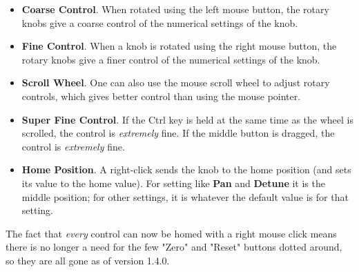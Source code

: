    \begin{itemize}

      \item \textbf{Coarse Control}.
         When rotated using the left mouse button, the rotary knobs give a
         coarse control of the numerical settings of the knob.

      \item \textbf{Fine Control}.
         When a knob is rotated using the right mouse button, the rotary knobs
         give a finer control of the numerical settings of the knob.

      \item \textbf{Scroll Wheel}.
         One can also use the mouse scroll wheel to adjust rotary controls,
         which gives better control than using the mouse pointer.

      \item \textbf{Super Fine Control}.
         If the Ctrl key is held at the same time as the wheel is scrolled, the
         control is \textsl{extremely} fine.
         If the middle button is dragged, the
         control is \textsl{extremely} fine.


      \item \textbf{Home Position}.
         A right-click sends the knob to the home position (and sets its value
         to the home value). For setting like \textbf{Pan} and
         \textbf{Detune} it is the middle position; for other settings,
         it is whatever the default value is for that setting.

   \end{itemize}

   The fact that \textsl{every} control can now be homed with a right mouse
   click means there is no longer a need for the few "Zero" and "Reset" buttons
   dotted around, so they are all gone as of version 1.4.0.

